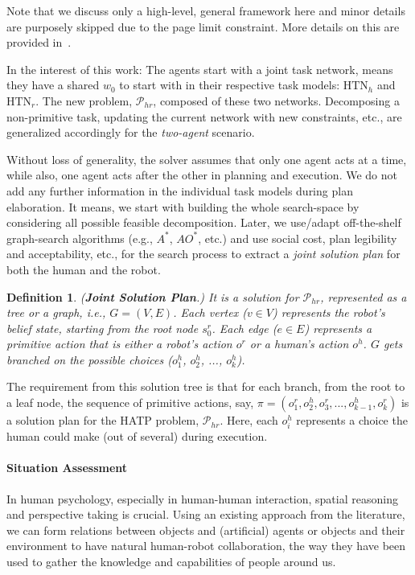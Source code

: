 \documentclass[letterpaper]{article} %
\newtheorem{definition}{Definition}
\begin{document}
Note that we discuss only a high-level, general framework here and minor details are purposely skipped due to the page limit constraint. More details on this are provided in~\cite{thesisBuisan21,buisan:hal-03684211}. 

In the interest of this work: The agents start with a joint task network, means they have a shared $w_0$ to start with in their respective task models: $\mathrm{HTN}_{h}$ and $\mathrm{HTN}_{r}$. The new problem, $\mathcal{P}_{hr}$, composed of these two networks. Decomposing a non-primitive task, updating the current network with new constraints, etc., are generalized accordingly for the \textit{two-agent} scenario. 

Without loss of generality, the solver assumes that only one agent acts at a time, while also, one agent acts after the other in planning and execution. 
We do not add any further information in the individual task models during plan elaboration. It means, we start with building the whole search-space by considering all possible feasible decomposition. Later, we use/adapt off-the-shelf graph-search algorithms (e.g., $A^*$, $AO^*$, etc.) and use social cost, plan legibility and acceptability, etc., for the search process to extract a \textit{joint solution plan} for both the human and the robot. 

\begin{definition}
(\textbf{Joint Solution Plan}.) 
{It is a solution for $\mathcal{P}_{hr}$, represented as a tree or a graph, i.e., $G=(V,E)$. Each vertex ($v \in V$) represents the robot's belief state, starting from the root node $s_0^r$. Each edge ($e \in E$) represents a primitive action that is either a robot's action $o^{r}$ or a human's action $o^{h}$. $G$ gets branched on the possible choices ($o^{h}_1$, $o^{h}_2$, ..., $o^{h}_k$). 
}  
\end{definition}

The requirement from this solution tree is that for each branch, from the root to a leaf node, the sequence of primitive actions, say,  $\pi=(o_1^r,o_2^h,o_3^r,...,o_{k-1}^h,o_k^r)$ is a solution plan for the HATP problem, $\mathcal{P}_{hr}$. Here, each $o_i^h$ represents a choice the human could make (out of several) during execution.

\paragraph{Situation Assessment} In human psychology, especially in human-human interaction, spatial reasoning and perspective taking is crucial. 
Using an existing approach from the literature, we can form relations between objects and (artificial) agents or objects and their environment to have natural human-robot collaboration, the way they have been used to gather the knowledge and capabilities of people around us. 
\end{document}
